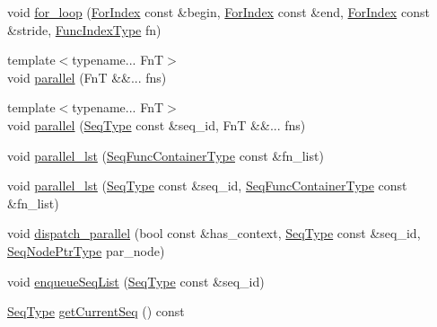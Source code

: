\begin{DoxyCompactItemize}
void \hyperlink{structvt_1_1seq_1_1_tagged_sequencer_a798c857fbac821760fbdf54cd4515505}{for\+\_\+loop} (\hyperlink{namespacevt_1_1seq_a6c570c39bac8f93bafe0bf8a0db8c798}{For\+Index} const \&begin, \hyperlink{namespacevt_1_1seq_a6c570c39bac8f93bafe0bf8a0db8c798}{For\+Index} const \&end, \hyperlink{namespacevt_1_1seq_a6c570c39bac8f93bafe0bf8a0db8c798}{For\+Index} const \&stride, \hyperlink{namespacevt_1_1seq_a822a80f3859b6840e7114128a06ac197}{Func\+Index\+Type} fn)
\item 
{\footnotesize template$<$typename... FnT$>$ }\\void \hyperlink{structvt_1_1seq_1_1_tagged_sequencer_a3742a3c79eb8cd4cb92e7beb9d04c0bb}{parallel} (FnT \&\&... fns)
\item 
{\footnotesize template$<$typename... FnT$>$ }\\void \hyperlink{structvt_1_1seq_1_1_tagged_sequencer_a7c4bc9187cec9dd34746fb8703a1058c}{parallel} (\hyperlink{structvt_1_1seq_1_1_tagged_sequencer_a1c8ee839258d0f88c49ef660267a81d5}{Seq\+Type} const \&seq\+\_\+id, FnT \&\&... fns)
\item 
void \hyperlink{structvt_1_1seq_1_1_tagged_sequencer_a22592981151ecba9f8047cb6317ef84a}{parallel\+\_\+lst} (\hyperlink{structvt_1_1seq_1_1_tagged_sequencer_a3843fac93a70e2d9375b33515938696f}{Seq\+Func\+Container\+Type} const \&fn\+\_\+list)
\item 
void \hyperlink{structvt_1_1seq_1_1_tagged_sequencer_ab6948624b620ef87cb23cb401ee709b9}{parallel\+\_\+lst} (\hyperlink{structvt_1_1seq_1_1_tagged_sequencer_a1c8ee839258d0f88c49ef660267a81d5}{Seq\+Type} const \&seq\+\_\+id, \hyperlink{structvt_1_1seq_1_1_tagged_sequencer_a3843fac93a70e2d9375b33515938696f}{Seq\+Func\+Container\+Type} const \&fn\+\_\+list)
\item 
void \hyperlink{structvt_1_1seq_1_1_tagged_sequencer_a630c6ca99c2741c5156b4911c611913b}{dispatch\+\_\+parallel} (bool const \&has\+\_\+context, \hyperlink{structvt_1_1seq_1_1_tagged_sequencer_a1c8ee839258d0f88c49ef660267a81d5}{Seq\+Type} const \&seq\+\_\+id, \hyperlink{namespacevt_1_1seq_ae6a4874b585be0612aaca32ca6d2d191}{Seq\+Node\+Ptr\+Type} par\+\_\+node)
\item 
void \hyperlink{structvt_1_1seq_1_1_tagged_sequencer_a19fff2edf483162cfe8af618d5d8ff32}{enqueue\+Seq\+List} (\hyperlink{structvt_1_1seq_1_1_tagged_sequencer_a1c8ee839258d0f88c49ef660267a81d5}{Seq\+Type} const \&seq\+\_\+id)
\item 
\hyperlink{structvt_1_1seq_1_1_tagged_sequencer_a1c8ee839258d0f88c49ef660267a81d5}{Seq\+Type} \hyperlink{structvt_1_1seq_1_1_tagged_sequencer_ad5f953ad23ebde1a92fdd13256575f32}{get\+Current\+Seq} () const

\end{DoxyCompactItemize}
